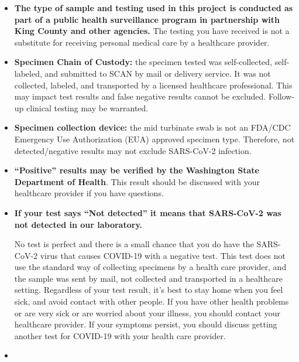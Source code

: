 \documentclass[12pt]{article}
\begin{document}
\begin{itemize}
\item

  \textbf{The type of sample and testing used in this project is
  conducted as part of a public health surveillance program in
  partnership with King County and other agencies.} The testing you have
  received is not a substitute for receiving personal medical care by a
  healthcare provider.

\item

  \textbf{Specimen Chain of Custody:} the specimen tested was
  self-collected, self-labeled, and submitted to SCAN by mail or
  delivery service. It was not collected, labeled, and transported by a
  licensed healthcare professional. This may impact test results and
  false negative results cannot be excluded. Follow-up clinical testing
  may be warranted.

\item

  \textbf{Specimen collection device:} the mid turbinate swab is not an
  FDA/CDC Emergency Use Authorization (EUA) approved specimen type.
  Therefore, not detected/negative results may not exclude SARS-CoV-2
  infection.

\item

  \textbf{``Positive'' results may be verified by the Washington State
  Department of Health}. This result should be discussed with your
  healthcare provider if you have questions.

\item{
  \textbf{If your test says ``Not detected'' it means that SARS-CoV-2
    was not detected in our laboratory.}

  No test is perfect and there is a small chance that you do have the
  SARS-CoV-2 virus that causes COVID-19 with a negative test. This test
  does not use the standard way of collecting specimens by a health care
  provider, and the sample was sent by mail, not collected and transported
  in a healthcare setting. Regardless of your test result, it's best to
  stay home when you feel sick, and avoid contact with other people. If
  you have other health problems or are very sick or are worried about
  your illness, you should contact your healthcare provider. If your
  symptoms persist, you should discuss getting another test for COVID-19
  with your health care provider.
}

\item


\end{itemize}
\end{document}
